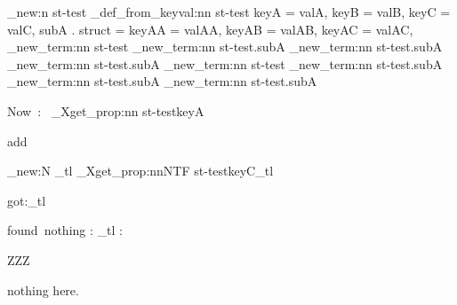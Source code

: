 \documentclass{article}
\begin{document}
%
%
%
%

%
%
%
%
\starray_new:n {st-test}
\starray_def_from_keyval:nn {st-test}
  {
    keyA = valA,
    keyB = valB,
    keyC = valC,
    subA . struct =
      {
        keyAA = valAA,
        keyAB = valAB,
        keyAC = valAC,
      }
  }
\starray_new_term:nn {st-test}{}
\starray_new_term:nn {st-test.subA}{}
\starray_new_term:nn {st-test.subA}{}
\starray_new_term:nn {st-test.subA}{}
\starray_new_term:nn {st-test}{}
\starray_new_term:nn {st-test.subA}{}
\starray_new_term:nn {st-test.subA}{}
\starray_new_term:nn {st-test.subA}{}

\par Now~:~
\starray_Xget_prop:nn {st-test}{keyA}\par
add\par

\tl_new:N \tmp_tl
\starray_Xget_prop:nnNTF {st-test}{keyC}\tmp_tl
  {got:\tmp_tl\par}
  {found~nothing : \tmp_tl :\par}

ZZZ\par


\ExplSyntaxOff
nothing here.
\end{document}
